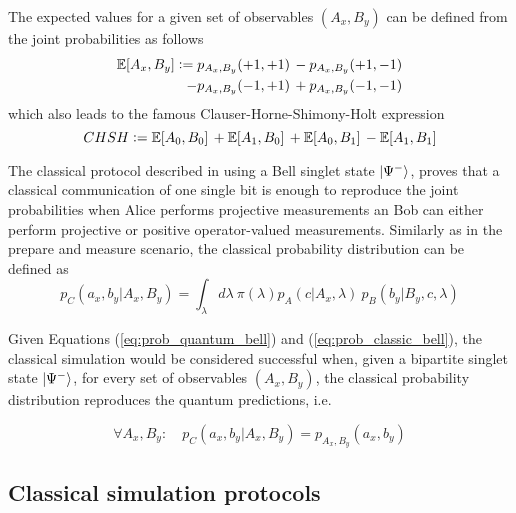 The expected values for a given set of observables $(A_{x}, B_{y})$ can be defined from the joint probabilities as follows
\begin{equation}\label{eq:bell_expected_values}
\begin{split}
\mathbb{E}[A_{x}, B_{y}] \vcentcolon= p_{A_x,B_y}(+1, +1)\,- p_{A_x,B_y}(+1, -1)\\-p_{A_x,B_y}(-1, +1)\,+ p_{A_x,B_y}(-1, -1)
\end{split}
\end{equation}
which also leads to the famous Clauser-Horne-Shimony-Holt expression
\begin{equation}\label{eq:bell_inequality}
CHSH \vcentcolon= \mathbb{E}[A_{0},B_{0}]\,+\mathbb{E}[A_{1},B_{0}]\,+\mathbb{E}[A_{0},B_{1}]\,-\mathbb{E}[A_{1},B_{1}]
\end{equation}

The classical protocol described in \cite{renner2023} using a Bell singlet state $\ket{\Psi^{-}}$, proves that a classical communication of one single bit is enough to reproduce the joint probabilities when Alice performs projective measurements an Bob can either perform projective or positive operator-valued measurements. Similarly as in the prepare and measure scenario, the classical probability distribution can be defined as
\begin{equation}\label{eq:prob_classic_bell}
p_C(a_{x}, b_{y}|A_{x},B_{y}) = \int_{\lambda} d\lambda\ \pi(\lambda) p_A(c|A_{x}, \lambda)\ p_B(b_{y}|B_{y}, c, \lambda)
\end{equation}

Given Equations (\ref{eq:prob_quantum_bell}) and (\ref{eq:prob_classic_bell}), the classical simulation would be considered successful when, given a bipartite singlet state $\ket{\Psi^{-}}$, for every set of observables $(A_{x}, B_{y})$, the classical probability distribution reproduces the quantum predictions, i.e.

\begin{equation}\label{eq:prob_classic_quantum_bell}
\forall A_{x}, B_{y}:\quad p_C(a_{x}, b_{y}|A_{x},B_{y}) = p_{A_x,B_y}(a_x, b_y)
\end{equation}

\subsection{Classical simulation protocols}\label{section:protocols}
